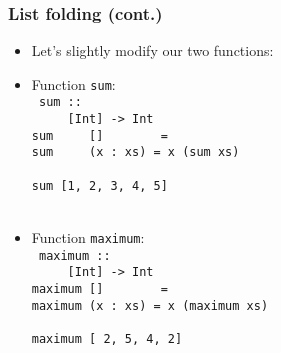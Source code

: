 \documentclass[final,handout]{beamer}
\begin{document}
\begin{frame}[fragile]
    \frametitle{List folding (cont.)}

    \begin{itemize}
        \item Let's slightly modify our two functions:

            \item Function \texttt{sum}: \\
    {\tt\small
sum :: \\
~~~~ [Int] -> Int\\
sum~~~~  \onslide<2->{val} []~~~~~~~ = \\
sum~~~~ \onslide<11->{f}  (x : xs) =
 x (sum   xs)
\\~\\
\quad sum   [1, 2, 3, 4, 5]
}
\\~
        \item Function \texttt{maximum}: \\
    {\tt\small
maximum :: \\
~~~~  [Int] -> Int\\
maximum  \onslide<6->{val} []~~~~~~~ =
\\
maximum \onslide<14->{f}  (x : xs) =
 x (maximum   xs)\\
~\\
\quad maximum  
[ 2, 5, 4, 2]
}


    \end{itemize}
\end{frame}
\end{document}
